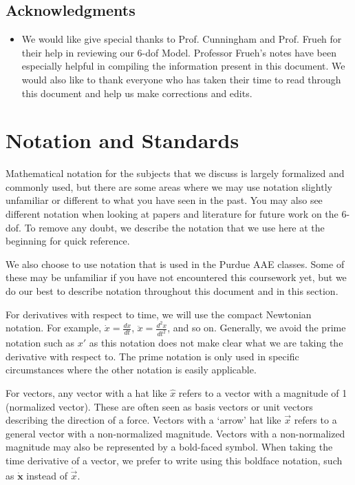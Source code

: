 \documentclass[12pt]{report}
\begin{document}
\section*{Acknowledgments}
\begin{itemize}
\item We would like give special thanks to Prof. Cunningham and Prof. Frueh for their help in reviewing our 6-\gls{dof} Model. Professor Frueh's notes have been especially helpful in compiling the information present in this document. We would also like to thank everyone who has taken their time to read through this document and help us make corrections and edits.
\end{itemize}


\chapter*{Notation and Standards}
Mathematical notation for the subjects that we discuss is largely formalized and commonly used, but there are some areas where we may use notation slightly unfamiliar or different to what you have seen in the past. You may also see different notation when looking at papers and literature for future work on the 6-\gls{dof}. To remove any doubt, we describe the notation that we use here at the beginning for quick reference.

We also choose to use notation that is used in the Purdue AAE classes. Some of these may be unfamiliar if you have not encountered this coursework yet, but we do our best to describe notation throughout this document and in this section.

For derivatives with respect to time, we will use the compact Newtonian notation. For example, $\dot{x}=\frac{dx}{dt}$, $\ddot{x}=\frac{d^2x}{dt^2}$, and so on. Generally, we avoid the prime notation such as $x'$ as this notation does not make clear what we are taking the derivative with respect to. The prime notation is only used in specific circumstances where the other notation is easily applicable.

For vectors, any vector with a hat like $\hat{x}$ refers to a vector with a magnitude of 1 (normalized vector). These are often seen as basis vectors or unit vectors describing the direction of a force. Vectors with a ‘arrow’ hat like $\vec{x}$ refers to a general vector with a non-normalized magnitude. Vectors with a non-normalized magnitude may also be represented by a bold-faced symbol. When taking the time derivative of a vector, we prefer to write using this boldface notation, such as $\dot{\textbf{x}}$ instead of $\dot{\vec{x}}$. 
\end{document}
